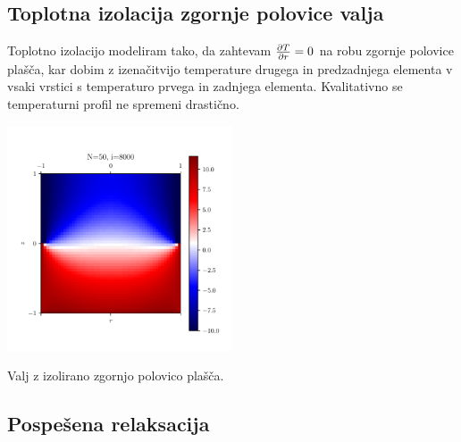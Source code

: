 \subsection{Toplotna izolacija zgornje polovice valja}
Toplotno izolacijo modeliram tako, da zahtevam $\frac{\partial T}{\partial r}=0$ na robu zgornje polovice plašča, kar dobim z izenačitvijo temperature drugega in predzadnjega elementa v vsaki vrstici s temperaturo prvega in zadnjega elementa. Kvalitativno se temperaturni profil ne spremeni drastično.
\begin{center}
    \includegraphics[width=0.5\textwidth]{../old/2-valj-profili50_8000_iso.pdf}
    \begin{minipage}{0.5\textwidth}
        Valj z izolirano zgornjo polovico plašča.
    \end{minipage}
\end{center}


\subsection{Pospešena relaksacija}

